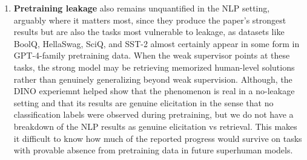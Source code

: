 \documentclass{article}
\begin{document}
\begin{enumerate}[leftmargin=*]
\begin{enumerate}[leftmargin=*]
The paper acknowledges this disanalogy in Section 6.1 but offers no experimental test that would distinguish between two interpretations of the positive results: that weak-to-strong works because of genuine elicitation of latent capability, or that it works because today's strong models accidentally resist imitation due to representational distance from their supervisors. An experiment such as we pretrain the strong model on supervisor-like behavior and measure whether PGR collapses would help figure out whether current results will hold in the future superhuman setting (which is the setting the paper is preparing for).
\item \textbf{Pretraining leakage} also remains unquantified in the NLP setting, arguably where it matters most, since they produce the paper's strongest results but are also the tasks most vulnerable to leakage, as datasets like BoolQ, HellaSwag, SciQ, and SST-2 almost certainly appear in some form in GPT-4-family pretraining data. When the weak supervisor points at these tasks, the strong model may be retrieving memorized human-level solutions rather than genuinely generalizing beyond weak supervision. Although, the DINO experiemnt helped show that the phenomenon is real in a no-leakage setting and that its results are genuine elicitation in the sense that no classification labels were observed during pretraining, but we do not have a breakdown of the NLP results as genuine elicitation vs retrieval. This makes it difficult to know how much of the reported progress would survive on tasks with provable absence from pretraining data in future superhuman models.


\end{enumerate}
\end{enumerate}
\end{document}

